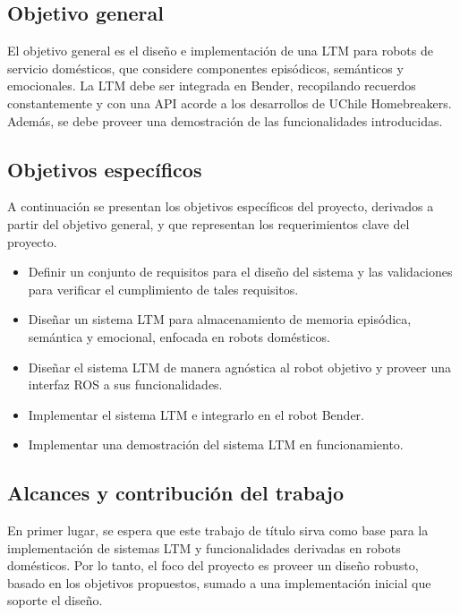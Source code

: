 \subsection{Objetivo general}

El objetivo general es el diseño e implementación de una LTM para robots de servicio domésticos, que considere componentes episódicos, semánticos y emocionales. La LTM debe ser integrada en Bender, recopilando recuerdos constantemente y con una API acorde a los desarrollos de UChile Homebreakers. Además, se debe proveer una demostración de las funcionalidades introducidas.


\subsection{Objetivos específicos}

A continuación se presentan los objetivos específicos del proyecto, derivados a partir del objetivo general, y que representan los requerimientos clave del proyecto.
\begin{itemize}
	\item Definir un conjunto de requisitos para el diseño del sistema y las validaciones para verificar el cumplimiento de tales requisitos.
	\item Diseñar un sistema LTM para almacenamiento de memoria episódica, semántica y emocional, enfocada en robots domésticos.
	\item Diseñar el sistema LTM de manera agnóstica al robot objetivo y proveer una interfaz ROS a sus funcionalidades.
	\item Implementar el sistema LTM e integrarlo en el robot Bender.
	\item Implementar una demostración del sistema LTM en funcionamiento.
\end{itemize}


\subsection{Alcances y contribución del trabajo}

En primer lugar, se espera que este trabajo de título sirva como base para la implementación de sistemas LTM y funcionalidades derivadas en robots domésticos. Por lo tanto, el foco del proyecto es proveer un diseño robusto, basado en los objetivos propuestos, sumado a una implementación inicial que soporte el diseño. 

